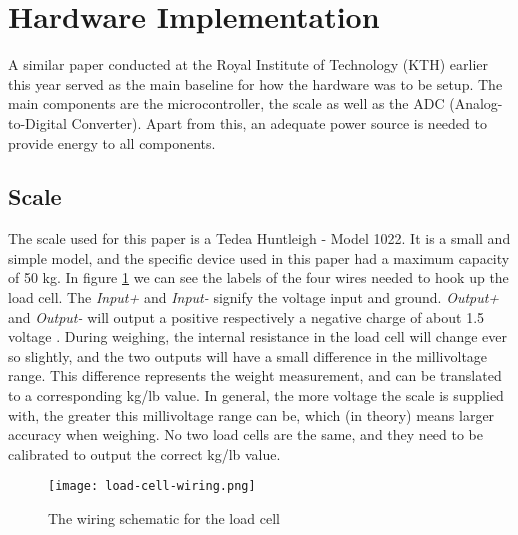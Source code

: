 




\section{Hardware Implementation}

A similar paper conducted at the Royal Institute of Technology (KTH) earlier this year served as the main baseline for how the hardware was to be setup.\cite{hospital} The main components are the microcontroller, the scale as well as the ADC (Analog-to-Digital Converter). Apart from this, an adequate power source is needed to provide energy to all components. 

\subsection{Scale}
The scale used for this paper is a Tedea Huntleigh - Model 1022. It is a small and simple model, and the specific device used in this paper had a maximum capacity of 50 kg.\cite{load-cell-data} In figure \ref{fig:load_cell_wiring} we can see the labels of the four wires needed to hook up the load cell. The \textit{Input+} and \textit{Input-} signify the voltage input and ground. \cite{load-cell-spec} \textit{Output+} and \textit{Output-} will output a positive respectively a negative charge of about 1.5 voltage . During weighing, the internal resistance in the load cell will change ever so slightly, and the two outputs will have a small difference in the millivoltage range. This difference represents the weight measurement, and can be translated to a corresponding kg/lb value. In general, the more voltage the scale is supplied with, the greater this millivoltage range can be, which (in theory) means larger accuracy when weighing. No two load cells are the same, and they need to be calibrated to output the correct kg/lb value.

\begin{figure}[h]
	\centering
	\texttt{[image: load-cell-wiring.png]}
	\caption{The wiring schematic for the load cell}
	\label{fig:load_cell_wiring}
\end{figure}


